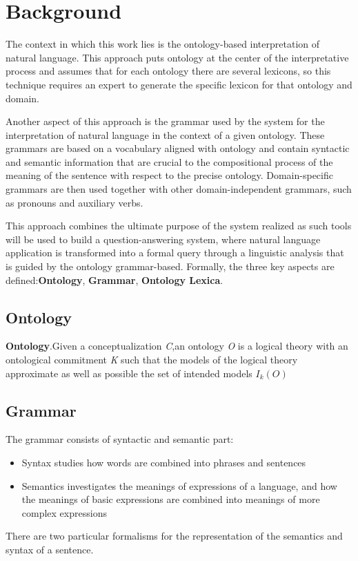 \section{Background}
\label{sec:background}
The context in which this work lies is the ontology-based interpretation of natural language. This approach puts ontology at the center of the interpretative process and assumes that for each ontology there are several lexicons, so this technique requires an expert to generate the specific lexicon for that ontology and domain.

Another aspect of this approach is the grammar used by the system for the interpretation of natural language in the context of a given ontology. These grammars are based on a vocabulary aligned with ontology and contain syntactic and semantic information that are crucial to the compositional process of the meaning of the sentence with respect to the precise ontology.
Domain-specific grammars are then used together with other domain-independent grammars, such as pronouns and auxiliary verbs.

%
This approach combines the ultimate purpose of the system realized as such tools will be used to build a question-answering system, where natural language application is transformed into a formal query through a linguistic analysis that is guided by the ontology grammar-based.
Formally, the three key aspects are defined:\textbf{Ontology}, \textbf{Grammar}, \textbf{Ontology Lexica}.

\subsection{Ontology}
\theoremstyle{definition}
\begin{definition}
\newtheorem{defn}{Definition}[section]{\textbf{Ontology}.Given a conceptualization \textit{C},an ontology \textit{O} is a logical theory with an ontological commitment  \textit{K} such that the models of the logical theory approximate as well as possible the set of intended models \begin{math}I_k(O)\end{math}}
\end{definition}

\subsection{Grammar}
The grammar consists of syntactic and semantic part:
\begin{itemize} 
  \item Syntax studies how words are combined into phrases and sentences
  \item Semantics investigates the meanings of expressions of a language, and how the meanings of basic expressions are combined into meanings of more complex expressions
\end{itemize} 
There are two particular formalisms for the representation of the semantics and syntax of a sentence.

